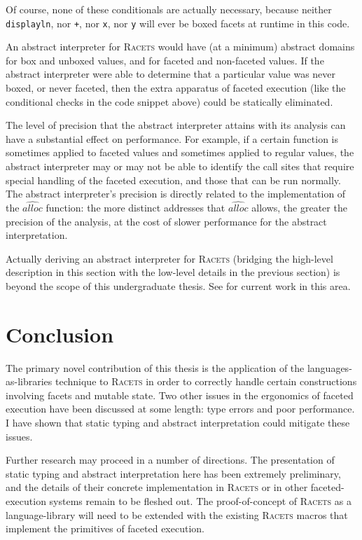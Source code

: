 \documentclass{article}
\begin{document}
Of course, none of these conditionals are actually necessary, because neither \texttt{displayln}, nor \texttt{+}, nor \texttt{x}, nor \texttt{y} will ever be boxed facets at runtime in this code.

An abstract interpreter for \textsc{Racets} would have (at a minimum) abstract domains for box and unboxed values, and for faceted and non-faceted values. If the abstract interpreter were able to determine that a particular value was never boxed, or never faceted, then the extra apparatus of faceted execution (like the conditional checks in the code snippet above) could be statically eliminated.

The level of precision that the abstract interpreter attains with its analysis can have a substantial effect on performance. For example, if a certain function is sometimes applied to faceted values and sometimes applied to regular values, the abstract interpreter may or may not be able to identify the call sites that require special handling of the faceted execution, and those that can be run normally. The abstract interpreter's precision is directly related to the implementation of the $\widehat{alloc}$ function: the more distinct addresses that $\widehat{alloc}$ allows, the greater the precision of the analysis, at the cost of slower performance for the abstract interpretation.

Actually deriving an abstract interpreter for \textsc{Racets} (bridging the high-level description in this section with the low-level details in the previous section) is beyond the scope of this undergraduate thesis. See \cite{abstract-inter} for current work in this area.



\section{Conclusion\label{sec:conclusion}}
The primary novel contribution of this thesis is the application of the languages-as-libraries technique to \textsc{Racets} in order to correctly handle certain constructions involving facets and mutable state. Two other issues in the ergonomics of faceted execution have been discussed at some length: type errors and poor performance. I have shown that static typing and abstract interpretation could mitigate these issues.

Further research may proceed in a number of directions. The presentation of static typing and abstract interpretation here has been extremely preliminary, and the details of their concrete implementation in \textsc{Racets} or in other faceted-execution systems remain to be fleshed out. The proof-of-concept of \textsc{Racets} as a language-library will need to be extended with the existing \textsc{Racets} macros that implement the primitives of faceted execution.
\end{document}
